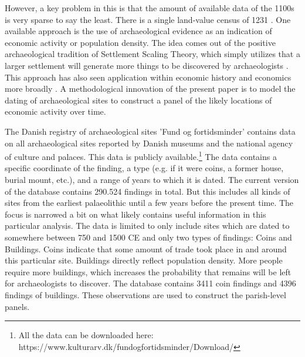 \documentclass[11pt]{article}
\begin{document}
However, a key problem in this is that the amount of available data of the 1100s is very sparse to say the least. There is a single land-value census of 1231 \citep{Poulsen2017}. One available approach is the use of archaeological evidence as an indication of economic activity or population density. The idea comes out of the positive archaeological tradition of Settlement Scaling Theory, which simply utilizes that a larger settlement will generate more things to be discovered by archaeologists \citep{Ortman2020}. This approach has also seen application within economic history and economics more broadly \citep{Davis2002, Bakker2021Phonecians, Allen2023, Barjamovic2019}. A methodological innovation of the present paper is to model the dating of archaeological sites to construct a panel of the likely locations of economic activity over time.

The Danish registry of archaeological sites 'Fund og fortidsminder' contains data on all archaeological sites reported by Danish museums and the national agency of culture and palaces. This data is publicly available.\footnote{All the data can be downloaded here: https://www.kulturarv.dk/fundogfortidsminder/Download/} The data contains a specific coordinate of the finding, a type (e.g. if it were coins, a former house, burial mount, etc.), and a range of years to which it is dated. The current version of the database contains 290.524 findings in total. But this includes all kinds of sites from the earliest palaeolithic until a few years before the present time. The focus is narrowed a bit on what likely contains useful information in this particular analysis. The data is limited to only include sites which are dated to somewhere between 750 and 1500 CE and only two types of findings: Coins and Buildings. Coins indicate that some amount of trade took place in and around this particular site. Buildings directly reflect population density. More people require more buildings, which increases the probability that remains will be left for archaeologists to discover. The database contains 3411 coin findings and 4396 findings of buildings. These observations are used to construct the parish-level panels.
\end{document}
